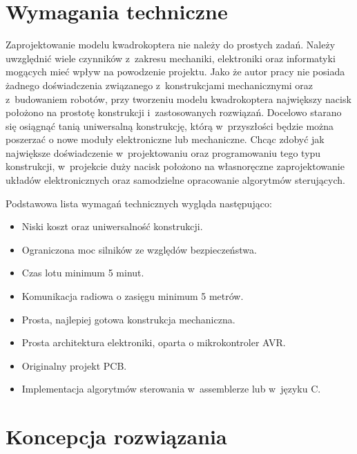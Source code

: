 \documentclass[11pt, twoside]{Thesis} %
\begin{document}


\section{Wymagania techniczne}

Zaprojektowanie modelu kwadrokoptera nie należy do prostych zadań. Należy uwzględnić wiele czynników z~zakresu mechaniki, elektroniki oraz informatyki mogących mieć wpływ na powodzenie projektu. Jako że autor pracy nie posiada żadnego doświadczenia związanego z~konstrukcjami mechanicznymi oraz z~budowaniem robotów, przy tworzeniu modelu kwadrokoptera największy nacisk położono na prostotę konstrukcji i~zastosowanych rozwiązań. Docelowo starano się osiągnąć tanią uniwersalną konstrukcję, którą w~przyszłości będzie można poszerzać o nowe moduły elektroniczne lub mechaniczne. Chcąc zdobyć jak największe doświadczenie w~projektowaniu oraz programowaniu tego typu konstrukcji, w~projekcie duży nacisk położono na własnoręczne zaprojektowanie układów elektronicznych oraz samodzielne opracowanie algorytmów sterujących.

Podstawowa lista wymagań technicznych wygląda następująco:

\begin{itemize}
	\item Niski koszt oraz uniwersalność konstrukcji.
	\item Ograniczona moc silników ze względów bezpieczeństwa.
	\item Czas lotu minimum 5 minut.
	\item Komunikacja radiowa o zasięgu minimum 5 metrów.
	\item Prosta, najlepiej gotowa konstrukcja mechaniczna.
	\item Prosta architektura elektroniki, oparta o mikrokontroler AVR.
	\item Originalny projekt PCB.
	\item Implementacja algorytmów sterowania w~assemblerze lub w~języku C.
\end{itemize}

\section{Koncepcja rozwiązania}
\end{document}
